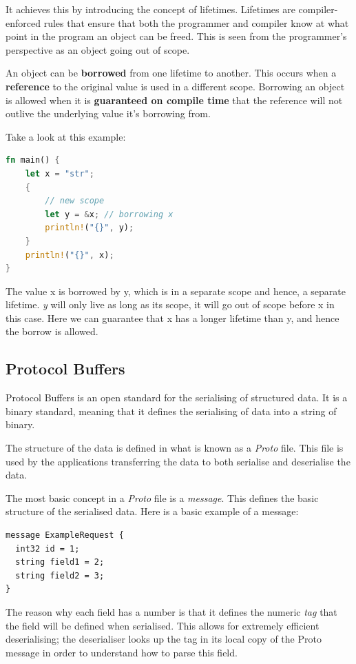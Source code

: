\documentclass[a4paper,12pt]{report}
\begin{document}
It achieves this by introducing the concept of lifetimes. Lifetimes are compiler-enforced rules that ensure that both the programmer and compiler know at what point in the program an object can be freed. 
This is seen from the programmer's perspective as an object going out of scope. 

An object can be \textbf{borrowed} from one lifetime to another. This occurs when a \textbf{reference} to the original value is used in a different scope.
Borrowing an object is allowed when it is \textbf{guaranteed on compile time} that the reference will not outlive the underlying value it's borrowing from.

Take a look at this example:

\begin{lstlisting}[language=Rust]
fn main() {
    let x = "str";
    {
        // new scope
        let y = &x; // borrowing x
        println!("{}", y);
    }
    println!("{}", x);
}
\end{lstlisting}

The value x is borrowed by y, which is in a separate scope and hence, a separate lifetime.
\textit{y} will only live as long as its scope, it will go out of scope before x in this case.
Here we can guarantee that x has a longer lifetime than y, and hence the borrow is allowed.


\subsection{Protocol Buffers}
\label{sec:protobufs}
Protocol Buffers \cite{protobuf} is an open standard for the serialising of structured data.
It is a binary standard, meaning that it defines the serialising of data into a string of binary.

The structure of the data is defined in what is known as a \textit{Proto} file. This file is used by the applications transferring the data to both serialise and deserialise the data. 

The most basic concept in a \textit{Proto} file is a \textit{message}. This defines the basic structure of the serialised data. Here is a basic example of a message:

\begin{lstlisting}
message ExampleRequest {
  int32 id = 1;
  string field1 = 2;
  string field2 = 3;
}
\end{lstlisting}

The reason why each field has a number is that it defines the numeric \textit{tag} that the field will be defined when serialised.
This allows for extremely efficient deserialising; the deserialiser looks up the tag in its local copy of the Proto message in order
to understand how to parse this field. 
\end{document}
